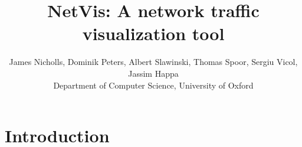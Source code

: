 

\title[NetVis Network Traffic Visualization]%
      {NetVis: A network traffic visualization tool}

\author[Nicholls et. al.]
       {James Nicholls, Dominik Peters,
       	Albert Slawinski, Thomas Spoor, Sergiu Vicol, Jassim Happa
        \\
         Department of Computer Science, University of Oxford
       }


%





\maketitle

\begin{abstract}
   

\begin{classification} %
\end{classification}

\end{abstract}

\section{Introduction}


